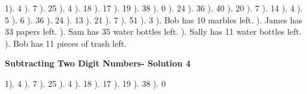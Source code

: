 \documentclass{article}%
\begin{document}
1). 4%
). 7%
). 25%
). 4%
). 18%
). 17%
). 19%
). 38%
). 0%
). 24%
). 36%
). 40%
). 20%
). 7%
). 14%
). 4%
). 5%
). 6%
). 36%
). 24%
). 13%
). 21%
). 7%
). 51%
). 3%
). Bob has 10 marbles left.%
). James has 33 papers left.%
). Sam has 35 water bottles left.%
). Sally has 11 water bottles left.%
). Bob has 11 pieces of trash left.%
\newline%
\newpage%
\large%
\begin{center}%
\textbf{Subtracting Two Digit Numbers- Solution 4}%
\newline%
\end{center} \normalsize%
1). 4%
). 7%
). 25%
). 4%
). 18%
). 17%
). 19%
). 38%
). 0%
\newline%
\end{document}
